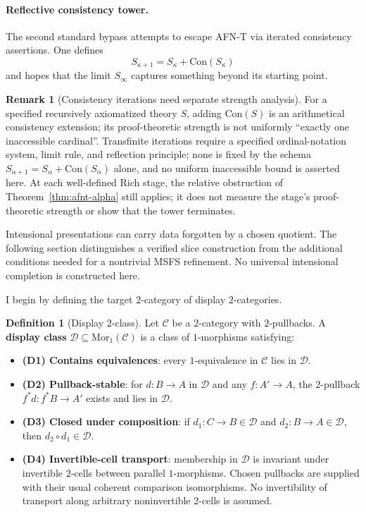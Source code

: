 \documentclass[11pt]{article}
\theoremstyle{plain}
\theoremstyle{definition}
\newtheorem{definition}[theorem]{Definition}
\newtheorem{remark}[theorem]{Remark}
\newcommand{\cC}{\mathcal{C}}
\newcommand{\cD}{\mathcal{D}}
\newcommand{\Mor}{\mathrm{Mor}}
\newcommand{\Con}{\mathrm{Con}}
\begin{document}
\paragraph{Reflective consistency tower.} The second standard bypass attempts to escape AFN-T via iterated consistency assertions. One defines
\[ S_{\kappa+1} = S_\kappa + \Con(S_\kappa) \]
and hopes that the limit $S_\infty$ captures something beyond its starting point.

\begin{remark}[Consistency iterations need separate strength analysis]\label{thm:reflective}
For a specified recursively axiomatized theory $S$, adding
$\mathrm{Con}(S)$ is an arithmetical consistency extension; its proof-theoretic strength
is not uniformly ``exactly one inaccessible cardinal''. Transfinite
iterations require a specified ordinal-notation system, limit rule, and reflection
principle; none is fixed by the schema $S_{\alpha+1}=S_\alpha+\mathrm{Con}(S_\alpha)$
alone, and no uniform inaccessible bound is asserted here. At each well-defined Rich stage, the
relative obstruction of Theorem~\ref{thm:afnt-alpha} still applies; it does not measure
the stage's proof-theoretic strength or show that the tower terminates.
\end{remark}

Intensional presentations can carry data forgotten by a chosen quotient. The following section distinguishes a verified slice construction from the additional conditions needed for a nontrivial MSFS refinement. No universal intensional completion is constructed here.

I begin by defining the target $2$-category of display $2$-categories.

\begin{definition}[Display $2$-class]\label{def:display-class}
Let $\cC$ be a $2$-category with $2$-pullbacks. A \textbf{display class} $\cD \subseteq \Mor_1(\cC)$ is a class of $1$-morphisms satisfying:
\begin{itemize}
\item \textbf{(D1) Contains equivalences}: every $1$-equivalence in $\cC$ lies in $\cD$.
\item \textbf{(D2) Pullback-stable}: for $d : B \to A$ in $\cD$ and any $f : A' \to A$, the $2$-pullback $f^*d : f^*B \to A'$ exists and lies in $\cD$.
\item \textbf{(D3) Closed under composition}: if $d_1 : C \to B \in \cD$ and $d_2 : B \to A \in \cD$, then $d_2 \circ d_1 \in \cD$.
\item \textbf{(D4) Invertible-cell transport}: membership in $\cD$ is invariant under invertible $2$-cells between parallel $1$-morphisms. Chosen pullbacks are supplied with their usual coherent comparison isomorphisms. No invertibility of transport along arbitrary noninvertible $2$-cells is assumed.
\end{itemize}
\end{definition}
\end{document}
